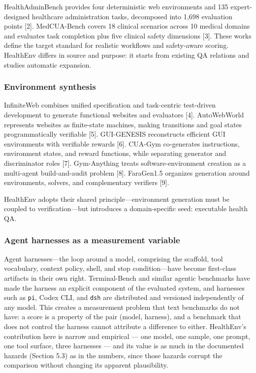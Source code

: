 \documentclass[
]{article}
\begin{document}
HealthAdminBench provides four deterministic web environments and 135
expert-designed healthcare administration tasks, decomposed into 1,698
evaluation points {[}2{]}. MedCUA-Bench covers 18 clinical scenarios
across 10 medical domains and evaluates task completion plus five
clinical safety dimensions {[}3{]}. These works define the target
standard for realistic workflows and safety-aware scoring. HealthEnv
differs in source and purpose: it starts from existing QA relations and
studies automatic expansion.

\subsubsection{Environment synthesis}\label{environment-synthesis}

InfiniteWeb combines unified specification and task-centric test-driven
development to generate functional websites and evaluators {[}4{]}.
AutoWebWorld represents websites as finite-state machines, making
transitions and goal states programmatically verifiable {[}5{]}.
GUI-GENESIS reconstructs efficient GUI environments with verifiable
rewards {[}6{]}. CUA-Gym co-generates instructions, environment states,
and reward functions, while separating generator and discriminator roles
{[}7{]}. Gym-Anything treats software-environment creation as a
multi-agent build-and-audit problem {[}8{]}. FaraGen1.5 organizes
generation around environments, solvers, and complementary verifiers
{[}9{]}.

HealthEnv adopts their shared principle---environment generation must be
coupled to verification---but introduces a domain-specific seed:
executable health QA.

\subsubsection{Agent harnesses as a measurement
variable}\label{agent-harnesses-as-a-measurement-variable}

Agent harnesses---the loop around a model, comprising the scaffold, tool
vocabulary, context policy, shell, and stop condition---have become
first-class artifacts in their own right. Terminal-Bench and similar
agentic benchmarks have made the harness an explicit component of the
evaluated system, and harnesses such as \texttt{pi}, Codex CLI, and
\texttt{dsh} are distributed and versioned independently of any model.
This creates a measurement problem that text benchmarks do not have: a
score is a property of the pair (model, harness), and a benchmark that
does not control the harness cannot attribute a difference to either.
HealthEnv's contribution here is narrow and empirical --- one model, one
sample, one prompt, one tool surface, three harnesses --- and its value
is as much in the documented hazards (Section 5.3) as in the numbers,
since those hazards corrupt the comparison without changing its apparent
plausibility.
\end{document}
